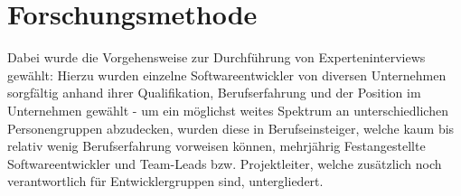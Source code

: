 \chapter{Forschungsmethode} %
\label{Research} %

Dabei wurde die Vorgehensweise zur Durchführung von Experteninterviews gewählt: Hierzu wurden einzelne Softwareentwickler von diversen Unternehmen sorgfältig
anhand ihrer Qualifikation, Berufserfahrung und der Position im Unternehmen gewählt - um ein möglichst weites Spektrum an unterschiedlichen Personengruppen abzudecken, wurden diese in Berufseinsteiger,
welche kaum bis relativ wenig Berufserfahrung vorweisen können, mehrjährig Festangestellte Softwareentwickler und Team-Leads bzw. Projektleiter, welche zusätzlich noch verantwortlich für Entwicklergruppen sind,
untergliedert.